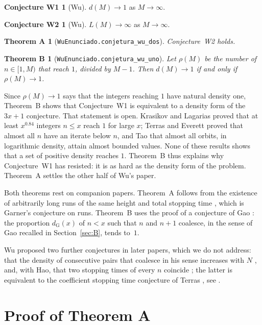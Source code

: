 \documentclass[11pt]{amsart}
\newtheorem*{theoremA}{Theorem A}
\newtheorem*{theoremB}{Theorem B}
\theoremstyle{definition}
\newtheorem*{conjecture1}{Conjecture W1}
\newtheorem*{conjecture2}{Conjecture W2}
\theoremstyle{remark}
\newcommand{\lean}[1]{\nolinkurl{#1}}
\begin{document}
\begin{conjecture1}[Wu]
$d(M)\to1$ as $M\to\infty$.
\end{conjecture1}

\begin{conjecture2}[Wu]
$L(M)\to\infty$ as $M\to\infty$.
\end{conjecture2}

\begin{theoremA}[\lean{WuEnunciado.conjetura_wu_dos}]
Conjecture~W2 holds.
\end{theoremA}

\begin{theoremB}[\lean{WuEnunciado.conjetura_wu_uno}]
Let $\rho(M)$ be the number of $n\in[1,M)$ that reach $1$, divided by $M-1$. Then $d(M)\to1$ if and only if $\rho(M)\to1$.
\end{theoremB}

Since $\rho(M)\to1$ says that the integers reaching $1$ have natural density one, Theorem~B shows that Conjecture~W1 is equivalent to a density form of the $3x+1$ conjecture. That statement is open. Krasikov and Lagarias \cite{KL03} proved that at least $x^{0.84}$ integers $n\le x$ reach $1$ for large $x$; Terras \cite{Ter76} and Everett \cite{Eve77} proved that almost all $n$ have an iterate below $n$, and Tao \cite{Tao22} that almost all orbits, in logarithmic density, attain almost bounded values. None of these results shows that a set of positive density reaches $1$. Theorem~B thus explains why Conjecture~W1 has resisted: it is as hard as the density form of the problem. Theorem~A settles the other half of Wu's paper.

Both theorems rest on companion papers. Theorem~A follows from the existence of arbitrarily long runs of the same height and total stopping time \cite{SaidGarner}, which is Garner's conjecture on runs. Theorem~B uses the proof of a conjecture of Gao \cite{SaidGao}: the proportion $d_{\mathrm{G}}(x)$ of $n<x$ such that $n$ and $n+1$ coalesce, in the sense of Gao \cite{Gao93} recalled in Section~\ref{sec:B}, tends to~$1$.

Wu proposed two further conjectures in later papers, which we do not address: that the density of consecutive pairs that coalesce in his sense increases with $N$ \cite{Wu95}, and, with Hao, that two stopping times of every $n$ coincide \cite{WH03}; the latter is equivalent to the coefficient stopping time conjecture of Terras \cite{Ter76}, see \cite[II, entry~124]{Lag03}.

\section{Proof of Theorem A}\label{sec:A}
\end{document}
